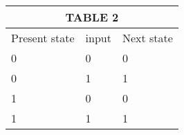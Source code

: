 \documentclass{article}
\begin{document}
\begin{tabular}{ |p{1cm}|p{1cm}|p{1cm}| }
\hline
\multicolumn{3}{|c|}{TABLE 2} \\
\hline
Present state & input & Next state  \\
\hline
  0 & 0 & 0 \\
\hline
0 & 1 & 1 \\
\hline
1 & 0 & 0 \\
\hline
1 & 1 & 1  \\
\hline

\end{tabular}
\end{document}
